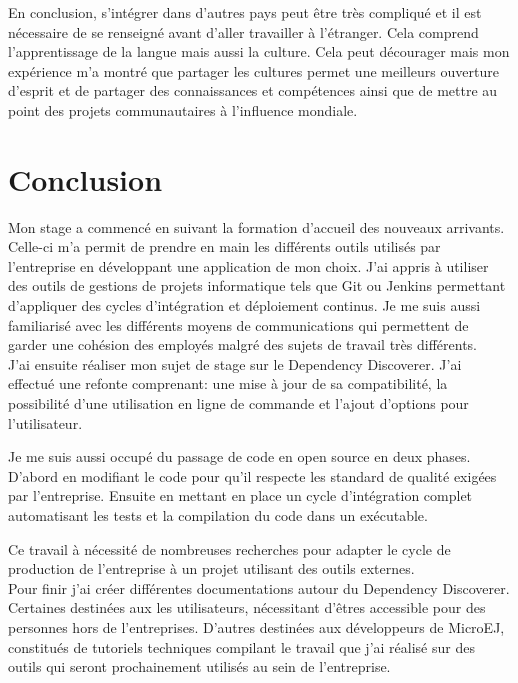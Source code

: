 \documentclass[french,a4paper,12pt]{report}
\begin{document}
En conclusion, s’intégrer dans d'autres pays peut être très compliqué et il est nécessaire de se renseigné avant d'aller travailler à l'étranger. Cela comprend l'apprentissage de la langue mais aussi la culture. Cela peut décourager mais mon expérience m'a montré que partager les cultures permet une meilleurs ouverture d'esprit et de partager des connaissances et compétences ainsi que de mettre au point des projets communautaires à l'influence mondiale.

\chapter{Conclusion}

Mon stage a commencé en suivant la formation d’accueil des nouveaux arrivants.
Celle-ci m'a permit de prendre en main les différents outils utilisés par l'entreprise en développant une application de mon choix. J'ai appris à utiliser des outils de gestions de projets informatique tels que Git ou Jenkins permettant d'appliquer des cycles d'intégration et déploiement continus.
Je me suis aussi familiarisé avec les différents moyens de communications qui permettent de garder une cohésion des employés malgré des sujets de travail très différents.\\

J'ai ensuite réaliser mon sujet de stage sur le Dependency Discoverer. J'ai effectué une refonte comprenant: une mise à jour de sa compatibilité, la possibilité d'une utilisation en ligne de commande et l'ajout d'options pour l’utilisateur. 

Je me suis aussi occupé du passage de code en open source en deux phases. D'abord en modifiant le code pour qu'il respecte les standard de qualité exigées par l'entreprise. Ensuite en mettant en place un cycle d'intégration complet automatisant les tests et la compilation du code dans un exécutable. 

Ce travail à nécessité de nombreuses recherches pour adapter le cycle de production de l'entreprise à un projet utilisant des outils externes.\\

Pour finir j'ai créer différentes documentations autour du Dependency Discoverer. Certaines destinées aux les utilisateurs, nécessitant d'êtres accessible pour des personnes hors de l'entreprises. D'autres destinées aux développeurs de MicroEJ, constitués de tutoriels techniques compilant le travail que j'ai réalisé sur des outils qui seront prochainement utilisés au sein de l'entreprise.\\
\end{document}
